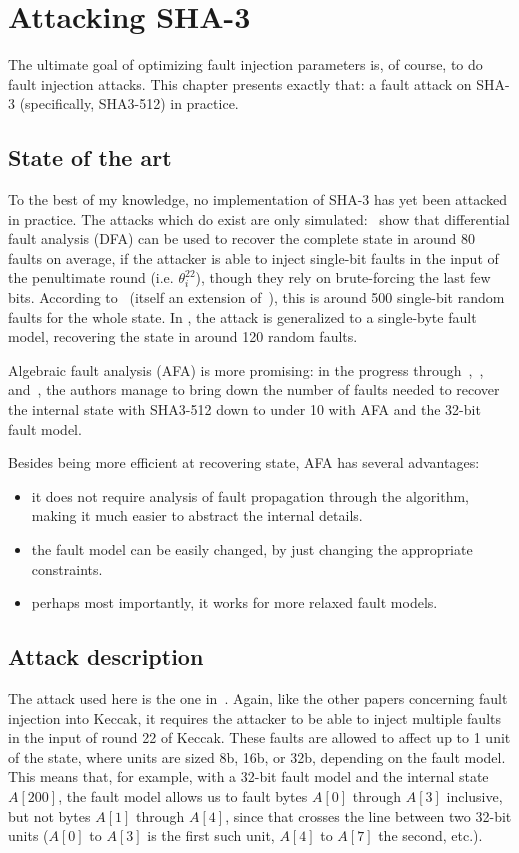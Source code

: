 \documentclass[times, utf8, diplomski]{fer}
\begin{document}
\chapter{Attacking SHA-3}\label{ch:attacking_keccak}
The ultimate goal of optimizing fault injection parameters is, of course, to
do fault injection attacks. This chapter presents exactly that: a fault attack
on SHA-3 (specifically, SHA3-512) in practice.

\section{State of the art}
To the best of my knowledge, no implementation of SHA-3 has yet been attacked in
practice. The attacks which do exist are only simulated:~\cite{DFA_SHA-3_single-bit}
show that differential fault analysis (DFA) can be used to recover the complete
state in around 80 faults on average, if the attacker is able to inject single-bit
faults in the input of the penultimate round (i.e. $\theta^{22}_i$), though they
rely on brute-forcing the last few bits. According to~\cite{luo2017relaxed}
(itself an extension of~\cite{luo2016shortSHA3}), this is around 500 single-bit
random faults for the whole state. In \cite{luo2017relaxed}, the attack is
generalized to a single-byte fault model, recovering the state in around 120
random faults.

Algebraic fault analysis (AFA) is more promising: in the progress
through~\cite{luo2016shortSHA3},~\cite{luo2017relaxed}, and~\cite{luo2018algebraic},
the authors manage to bring down the number of faults needed to recover the
internal state with SHA3-512 down to under 10 with AFA and the 32-bit fault
model.

Besides being more efficient at recovering state, AFA has several advantages:
\begin{itemize}
 \item it does not require analysis of fault propagation through the algorithm,
       making it much easier to abstract the internal details.
 \item the fault model can be easily changed, by just changing the appropriate constraints.
 \item perhaps most importantly, it works for more relaxed fault models.
\end{itemize}


\section{Attack description}
The attack used here is the one in~\cite{luo2018algebraic}.
Again, like the other papers concerning fault injection into Keccak, it requires
the attacker to be able to inject multiple faults in the input of round 22 of Keccak.
These faults are allowed to affect up to 1 unit of the state, where units are sized
8b, 16b, or 32b, depending on the fault model. This means that, for example, with
a 32-bit fault model and the internal state $A[200]$, the fault model allows us
to fault bytes $A[0]$ through $A[3]$ inclusive, but not bytes $A[1]$ through $A[4]$,
since that crosses the line between two 32-bit units ($A[0]$ to $A[3]$ is the first
such unit, $A[4]$ to $A[7]$ the second, etc.).
\end{document}

